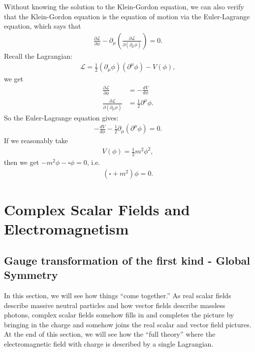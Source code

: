 \documentclass{book}
\numberwithin{equation}{section}
\theoremstyle{definition}
\newcommand{\p}{\partial}
\newcommand{\lag}{\mathcal{L}}
\newcommand{\f}[2]{\frac{#1}{#2}}
\begin{document}
Without knowing the solution to the Klein-Gordon equation, we can also verify that the Klein-Gordon equation is the equation of motion via the Euler-Lagrange equation, which says that
\begin{align}
\frac{\p \lag}{\p \phi} - \p_\mu\left( \frac{\p \lag}{\p(\p_\mu \phi)} \right) = 0.
\end{align}
Recall the Lagrangian:
\begin{align}
\lag = \frac{1}{2}(\p_\mu\phi)(\p^\mu\phi) - V(\phi),
\end{align}
we get
\begin{align}
\frac{\p\lag}{\p\phi} &= -\frac{dV}{d\phi}\\
\frac{\p\lag}{\p(\p_\mu\phi)} &= \f{1}{2}\p^\mu\phi.
\end{align}
So the Euler-Lagrange equation gives:
\begin{align}
-\frac{dV}{d\phi} - \f{1}{2}\p_\mu(\p^\mu\phi) = 0.
\end{align}
If we reasonably take
\begin{align}
V(\phi) = \frac{1}{2}m^2\phi^2,
\end{align}
then we get $-m^2\phi - \square \phi = 0$, i.e.
\begin{align}
(\square + m^2)\phi = 0.
\end{align}



\section{Complex Scalar Fields and Electromagnetism}
\subsection{Gauge transformation of the first kind - Global Symmetry}
In this section, we will see how things ``come together.'' As real scalar fields describe massive neutral particles and how vector fields describe massless photons, complex scalar fields somehow fills in and completes the picture by bringing in the charge and somehow joins the real scalar and vector field pictures. At the end of this section, we will see how the ``full theory'' where the electromagnetic field with charge is described by a single Lagrangian. \\
\end{document}

